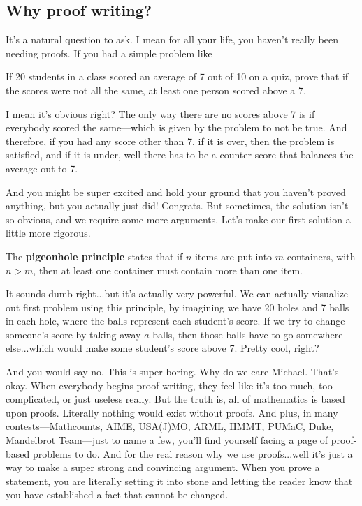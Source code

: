 \subsection{Why proof writing?}
It's a natural question to ask. I mean for all your life, you haven't really been needing proofs. If you had a simple problem like 
\begin{problem}
If 20 students in a class scored an average of 7 out of 10 on a quiz, prove that if the scores were not all the same, at least one person scored above a 7.
\end{problem}
I mean it's obvious right? The only way there are no scores above 7 is if everybody scored the same---which is given by the problem to not be true. And therefore, if you had any score other than 7, if it is over, then the problem is satisfied, and if it is under, well there has to be a counter-score that balances the average out to 7. 

And you might be super excited and hold your ground that you haven't proved anything, but you actually just did! Congrats. But sometimes, the solution isn't so obvious, and we require some more arguments. Let's make our first solution a little more rigorous.

\begin{definition}
The \textbf{pigeonhole principle} states that if $n$ items are put into $m$ containers, with $n > m$, then at least one container must contain more than one item.
\end{definition}

It sounds dumb right...but it's actually very powerful. We can actually visualize out first problem using this principle, by imagining we have 20 holes and 7 balls in each hole, where the balls represent each student's score. If we try to change someone's score by taking away $a$ balls, then those balls have to go somewhere else...which would make some student's score above 7. Pretty cool, right?

And you would say no. This is super boring. Why do we care Michael. That's okay. When everybody begins proof writing, they feel like it's too much, too complicated, or just useless really. But the truth is, all of mathematics is based upon proofs. Literally nothing would exist without proofs. And plus, in many contests---Mathcounts, AIME, USA(J)MO, ARML, HMMT, PUMaC, Duke, Mandelbrot Team---just to name a few, you'll find yourself facing a page of proof-based problems to do. And for the real reason why we use proofs...well it's just a way to make a super strong and convincing argument. When you prove a statement, you are literally setting it into stone and letting the reader know that you have established a fact that cannot be changed.

